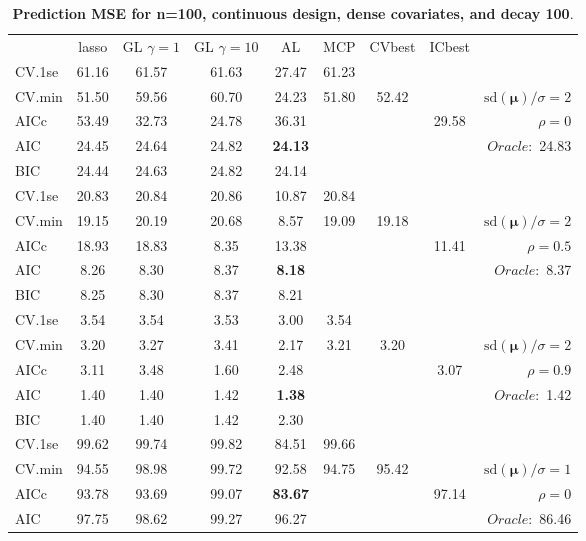 \clearpage
\begin{table}\vspace{-.5cm}
\caption[l]{ { \bf Prediction MSE for n=100, continuous design, 
dense covariates, and  decay  100}.}
\vspace{-.5cm}
\footnotesize{}
\begin{center}
\begin{tabular}{l*{7}{c}|r}
 & lasso & GL $\gamma=1$ & GL $\gamma=10$ & AL & MCP  & CVbest & ICbest  \\
\cline{1-9}
CV.1se & 61.16 & 61.57 & 61.63 & 27.47 & 61.23 & & & \\
CV.min & 51.50 & 59.56 & 60.70 & 24.23 & 51.80 & 52.42 & & $\mathrm{sd}(\mathbf{\mu})/\sigma=2$ \\
AICc & 53.49 & 32.73 & 24.78 & 36.31 & & & 29.58 &  $\rho=0$ \\
AIC & 24.45 & 24.64 & 24.82 & {\bf 24.13} & & & &  \multirow{2}{*}{$Oracle: $ 24.83} \\
BIC & 24.44 & 24.63 & 24.82 & 24.14 & & & &  \\
 \hline 
CV.1se & 20.83 & 20.84 & 20.86 & 10.87 & 20.84 & & & \\
CV.min & 19.15 & 20.19 & 20.68 & 8.57 & 19.09 & 19.18 & & $\mathrm{sd}(\mathbf{\mu})/\sigma=2$ \\
AICc & 18.93 & 18.83 & 8.35 & 13.38 & & & 11.41 &  $\rho=0.5$ \\
AIC & 8.26 & 8.30 & 8.37 & {\bf 8.18} & & & &  \multirow{2}{*}{$Oracle: $ 8.37} \\
BIC & 8.25 & 8.30 & 8.37 & 8.21 & & & &  \\
 \hline 
CV.1se & 3.54 & 3.54 & 3.53 & 3.00 & 3.54 & & & \\
CV.min & 3.20 & 3.27 & 3.41 & 2.17 & 3.21 & 3.20 & & $\mathrm{sd}(\mathbf{\mu})/\sigma=2$ \\
AICc & 3.11 & 3.48 & 1.60 & 2.48 & & & 3.07 &  $\rho=0.9$ \\
AIC & 1.40 & 1.40 & 1.42 & {\bf 1.38} & & & &  \multirow{2}{*}{$Oracle: $ 1.42} \\
BIC & 1.40 & 1.40 & 1.42 & 2.30 & & & &  \\
 \hline 
CV.1se & 99.62 & 99.74 & 99.82 & 84.51 & 99.66 & & & \\
CV.min & 94.55 & 98.98 & 99.72 & 92.58 & 94.75 & 95.42 & & $\mathrm{sd}(\mathbf{\mu})/\sigma=1$ \\
AICc & 93.78 & 93.69 & 99.07 & {\bf 83.67} & & & 97.14 &  $\rho=0$ \\
AIC & 97.75 & 98.62 & 99.27 & 96.27 & & & &  \multirow{2}{*}{$Oracle: $ 86.46} \\

\end{tabular}
\end{center}
\end{table}
